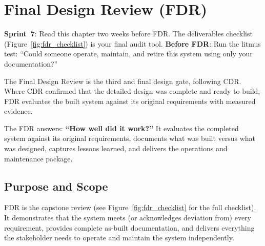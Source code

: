 \chapter{Final Design Review (FDR)}\label{ch:fdr}

\begin{tipbox}
\textbf{Sprint~7}: Read this chapter two weeks before FDR. The deliverables checklist (Figure~\ref{fig:fdr_checklist}) is your final audit tool. \textbf{Before FDR}: Run the litmus test: ``Could someone operate, maintain, and retire this system using only your documentation?''
\end{tipbox}


\vspace{1em}

The Final Design Review is the third and final design gate, following CDR. Where CDR confirmed that the detailed design was complete and ready to build, FDR evaluates the built system against its original requirements with measured evidence.

The FDR answers: \textbf{``How well did it work?''} It evaluates the completed system against its original requirements, documents what was built versus what was designed, captures lessons learned, and delivers the operations and maintenance package.

\vspace{1em}

\section{Purpose and Scope}
FDR is the capstone review (see Figure~\ref{fig:fdr_checklist} for the full checklist). It demonstrates that the system meets (or acknowledges deviation from) every requirement, provides complete as-built documentation, and delivers everything the stakeholder needs to operate and maintain the system independently.

